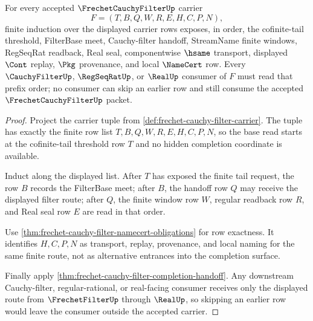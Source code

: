 \begin{theorem}
\label{thm:frechet-cauchy-filter-scope-ledger}
For every accepted $\FrechetCauchyFilterUp$ carrier
$$
F=(T,B,Q,W,R,E,H,C,P,N),
$$
finite induction over the displayed carrier rows exposes, in order, the cofinite-tail threshold, FilterBase meet, Cauchy-filter handoff, StreamName finite windows, RegSeqRat readback, Real seal, componentwise $\hsame$ transport, displayed $\Cont$ replay, $\Pkg$ provenance, and local $\NameCert$ row. Every $\CauchyFilterUp$, $\RegSeqRatUp$, or $\RealUp$ consumer of $F$ must read that prefix order; no consumer can skip an earlier row and still consume the accepted $\FrechetCauchyFilterUp$ packet.
\end{theorem}
\begin{proof}
Project the carrier tuple from \autoref{def:frechet-cauchy-filter-carrier}. The tuple has exactly the finite row list $T,B,Q,W,R,E,H,C,P,N$, so the base read starts at the cofinite-tail threshold row $T$ and no hidden completion coordinate is available.

Induct along the displayed list. After $T$ has exposed the finite tail request, the row $B$ records the FilterBase meet; after $B$, the handoff row $Q$ may receive the displayed filter route; after $Q$, the finite window row $W$, regular readback row $R$, and Real seal row $E$ are read in that order.

Use \autoref{thm:frechet-cauchy-filter-namecert-obligations} for row exactness. It identifies $H,C,P,N$ as transport, replay, provenance, and local naming for the same finite route, not as alternative entrances into the completion surface.

Finally apply \autoref{thm:frechet-cauchy-filter-completion-handoff}. Any downstream Cauchy-filter, regular-rational, or real-facing consumer receives only the displayed route from $\FrechetFilterUp$ through $\RealUp$, so skipping an earlier row would leave the consumer outside the accepted carrier.
\end{proof}



